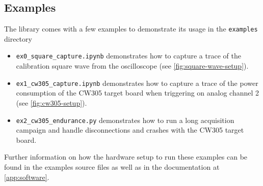 \documentclass[a4paper,english,twoside,10pt]{article}
\begin{document}
\subsection{Examples}
The library comes with a few examples to demonstrate its usage in the \texttt{examples} directory
\begin{itemize}
	\item \texttt{ex0\_square\_capture.ipynb} demonstrates how to capture a trace of the calibration square wave from the oscilloscope (see \autoref{fig:square-wave-setup}).
	\item \texttt{ex1\_cw305\_capture.ipynb} demonstrates how to capture a trace of the power consumption of the CW305 target board\cite{cw305:spec} when triggering on analog channel 2 (see \autoref{fig:cw305-setup}).
	\item \texttt{ex2\_cw305\_endurance.py} demonstrates how to run a long acquisition campaign and handle disconnections and crashes with the CW305 target board\cite{cw305:spec}.
\end{itemize}

Further information on how the hardware setup to run these examples can be found in the examples source files as well as in the documentation at \autoref{app:software}.
\end{document}
